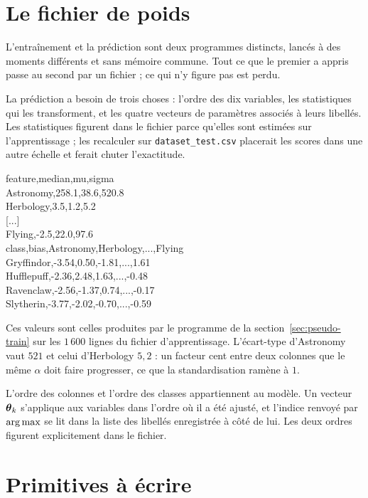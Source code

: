 \section{Le fichier de poids}
\label{sec:weights}

\begin{lecture}
L'entraînement et la prédiction sont deux programmes distincts, lancés à des
moments différents et sans mémoire commune. Tout ce que le premier a appris
passe au second par un fichier ; ce qui n'y figure pas est perdu.
\end{lecture}

La prédiction a besoin de trois choses : l'ordre des dix variables, les
statistiques qui les transforment, et les quatre vecteurs de paramètres associés
à leurs libellés. Les statistiques figurent dans le fichier parce qu'elles sont
estimées sur l'apprentissage ; les recalculer sur \texttt{dataset\_test.csv}
placerait les scores dans une autre échelle et ferait chuter l'exactitude.

\begin{fichier}
feature,median,mu,sigma\\
Astronomy,258.1,38.6,520.8\\
Herbology,3.5,1.2,5.2\\
{[}...{]}\\
Flying,-2.5,22.0,97.6\\
class,bias,Astronomy,Herbology,...,Flying\\
Gryffindor,-3.54,0.50,-1.81,...,1.61\\
Hufflepuff,-2.36,2.48,1.63,...,-0.48\\
Ravenclaw,-2.56,-1.37,0.74,...,-0.17\\
Slytherin,-3.77,-2.02,-0.70,...,-0.59
\end{fichier}

Ces valeurs sont celles produites par le programme de la
section~\ref{sec:pseudo-train} sur les $1\,600$ lignes du fichier
d'apprentissage. L'écart-type d'Astronomy vaut $521$ et celui d'Herbology
$5{,}2$ : un facteur cent entre deux colonnes que le même $\alpha$ doit faire
progresser, ce que la standardisation ramène à $1$.

L'ordre des colonnes et l'ordre des classes appartiennent au modèle. Un vecteur
$\boldsymbol{\theta}_k$ s'applique aux variables dans l'ordre où il a été ajusté, et l'indice
renvoyé par $\operatorname*{arg\,max}$ se lit dans la liste des libellés enregistrée à côté de
lui. Les deux ordres figurent explicitement dans le fichier.

\section{Primitives à écrire}

